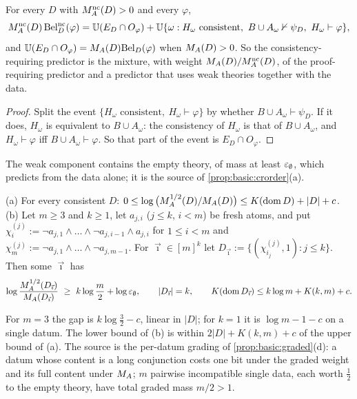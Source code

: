 \begin{proposition}\label{prop:basic:crmix}
For every $D$ with $M_{A}^{\mathrm{nc}}(D)>0$ and every $\varphi$,
\[
M_{A}^{\mathrm{nc}}(D)\,\mathrm{Bel}^{\mathrm{nc}}_D(\varphi)=\mathbb{U}(E_D\cap O_\varphi)+\mathbb{U}\{\omega:H_\omega\text{ consistent},\ B\cup A_\omega\nvdash\psi_D,\ H_\omega\vdash\varphi\},
\]
and $\mathbb{U}(E_D\cap O_\varphi)=M_{A}(D)\mathrm{Bel}_D(\varphi)$ when $M_{A}(D)>0$. So the consistency-requiring predictor is the mixture, with weight $M_{A}(D)/M_{A}^{\mathrm{nc}}(D)$, of the proof-requiring predictor and a predictor that uses weak theories together with the data.
\end{proposition}

\begin{proof}
Split the event $\{H_\omega\text{ consistent},\ H_\omega\vdash\varphi\}$ by whether $B\cup A_\omega\vdash\psi_D$. If it does, $H_\omega$ is equivalent to $B\cup A_\omega$: the consistency of $H_\omega$ is that of $B\cup A_\omega$, and $H_\omega\vdash\varphi$ iff $B\cup A_\omega\vdash\varphi$. So that part of the event is $E_D\cap O_\varphi$.
\end{proof}

The weak component contains the empty theory, of mass at least $\varepsilon_{\emptyset}$, which predicts from the data alone; it is the source of \cref{prop:basic:crorder}(a).

\begin{proposition}\label{prop:basic:gradedgap}
(a) For every consistent $D$: $0\le\log\big(M_{A}^{1/2}(D)/M_{A}(D)\big)\le K(\operatorname{dom} D)+\lvert D\rvert+c$.
(b) Let $m\ge3$ and $k\ge1$, let $a_{j,i}$ ($j\le k$, $i<m$) be fresh atoms, and put $\chi^{(j)}_i:=\neg a_{j,1}\wedge\dots\wedge\neg a_{j,i-1}\wedge a_{j,i}$ for $1\le i<m$ and $\chi^{(j)}_m:=\neg a_{j,1}\wedge\dots\wedge\neg a_{j,m-1}$. For $\vec\imath\in[m]^k$ let $D_{\vec\imath}:=\{(\chi^{(j)}_{i_j},1):j\le k\}$. Then some $\vec\imath$ has
\[
\log\frac{\MAhalf(D_{\vec\imath})}{\MA(D_{\vec\imath})}\ \ge\ k\log\frac m2+\log\epsempty,\qquad\lvert D_{\vec\imath}\rvert=k,\qquad K(\dom D_{\vec\imath})\le k\log m+K(k,m)+c .
\]
\end{proposition}

For $m=3$ the gap is $k\log\frac32-c$, linear in $\lvert D\rvert$; for $k=1$ it is $\log m-1-c$ on a single datum. The lower bound of (b) is within $2\lvert D\rvert+K(k,m)+c$ of the upper bound of (a). The source is the per-datum grading of \cref{prop:basic:graded}(d): a datum whose content is a long conjunction costs one bit under the graded weight and its full content under $M_{A}$; $m$ pairwise incompatible single data, each worth $\frac12$ to the empty theory, have total graded mass $m/2>1$.

